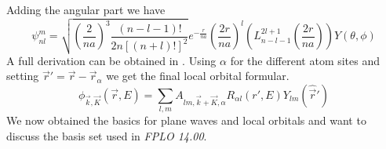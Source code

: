			Adding the angular part we have 
			\begin{equation}
				\psi_{nl}^m = \sqrt{\left( \frac{2}{na} \right)^3 \frac{(n-l-1)!}{2n[(n+l)!]^2}} e^{-\frac{r}{na}} \left( \frac{2r}{na} \right)^l \left( L_{n-l-1}^{2l+1} (\frac{2r}{na}) \right) Y(\theta, \phi)
			\end{equation}			
			A full derivation can be obtained in \cite{DJG01}.
			Using $\alpha$ for the different atom sites and setting $\vec r' = \vec r - \vec r_\alpha$ we get the final local orbital formular.
			\begin{equation}
				\phi_{\vec k, \vec K}(\vec r, E) = \sum_{l,m} A_{lm, \vec k + \vec K, \alpha} R_{\alpha l}(r', E) Y_{lm}( \hat{\vec r}')
			\end{equation}
			We now obtained the basics for plane waves and local orbitals and want to discuss the basis set used in \textit{FPLO 14.00}.
		
